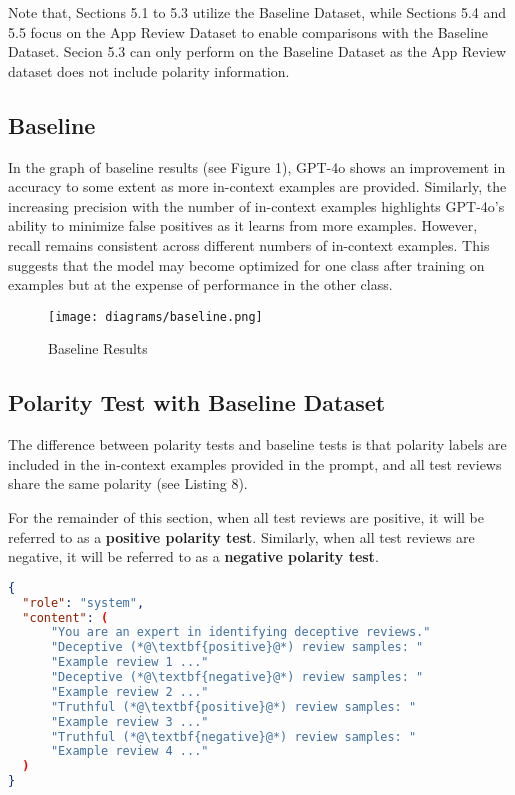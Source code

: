 \documentclass[sigconf, nonacm]{acmart}
\theoremstyle{definition}
\begin{document}
Note that, Sections 5.1 to 5.3 utilize the Baseline Dataset, while Sections 5.4 and 5.5 focus on the App Review Dataset to enable comparisons with the Baseline Dataset. Secion 5.3 can only perform on the Baseline Dataset as the App Review dataset does not include polarity information.

\subsection{Baseline}
In the graph of baseline results (see Figure 1), GPT-4o shows an improvement in accuracy to some extent as more in-context examples are provided. Similarly, the increasing precision with the number of in-context examples highlights GPT-4o's ability to minimize false positives as it learns from more examples. However, recall remains consistent across different numbers of in-context examples. This suggests that the model may become optimized for one class after training on examples but at the expense of performance in the other class.

\begin{figure}[h]
  \centering
  \texttt{[image: diagrams/baseline.png]}
  \caption{Baseline Results}
\end{figure}

\subsection{Polarity Test with Baseline Dataset}
The difference between polarity tests and baseline tests is that polarity labels are included in the in-context examples provided in the prompt, and all test reviews share the same polarity (see Listing 8).

For the remainder of this section, when all test reviews are positive, it will be referred to as a \textbf{positive polarity test}. Similarly, when all test reviews are negative, it will be referred to as a \textbf{negative polarity test}.

\begin{lstlisting}[language=json, caption={System Messages for Polarity Test}]
{
  "role": "system",
  "content": (
      "You are an expert in identifying deceptive reviews."
      "Deceptive (*@\textbf{positive}@*) review samples: "
      "Example review 1 ..."
      "Deceptive (*@\textbf{negative}@*) review samples: "
      "Example review 2 ..."
      "Truthful (*@\textbf{positive}@*) review samples: "
      "Example review 3 ..."
      "Truthful (*@\textbf{negative}@*) review samples: "
      "Example review 4 ..."
  )
}
\end{lstlisting}
\end{document}
